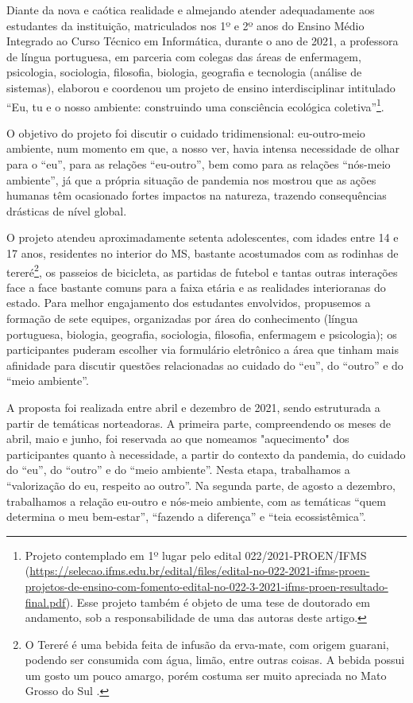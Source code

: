 Diante da nova e caótica realidade e almejando atender adequadamente aos estudantes da instituição, matriculados nos 1º e 2º anos do Ensino Médio Integrado ao Curso Técnico em Informática, durante o ano de 2021, a professora de língua portuguesa, em parceria com colegas das áreas de enfermagem, psicologia, sociologia, filosofia, biologia, geografia e tecnologia (análise de sistemas), elaborou e coordenou um projeto de ensino interdisciplinar intitulado “Eu, tu e o nosso ambiente: construindo uma consciência ecológica coletiva”\footnote{ Projeto contemplado em 1º lugar pelo edital 022/2021-PROEN/IFMS (\url{https://selecao.ifms.edu.br/edital/files/edital-no-022-2021-ifms-proen-projetos-de-ensino-com-fomento-edital-no-022-3-2021-ifms-proen-resultado-final.pdf}). Esse projeto também é objeto de uma tese de doutorado em andamento, sob a responsabilidade de uma das autoras deste artigo.}.

O objetivo do projeto foi discutir o cuidado tridimensional: eu-outro-meio ambiente, num momento em que, a nosso ver, havia intensa necessidade de olhar para o “eu”, para as relações “eu-outro”, bem como para as relações “nós-meio ambiente”, já que a própria situação de pandemia nos mostrou que as ações humanas têm ocasionado fortes impactos na natureza, trazendo consequências drásticas de nível global.

O projeto atendeu aproximadamente setenta adolescentes, com idades entre 14 e 17 anos, residentes no interior do MS, bastante acostumados com as rodinhas de tereré\footnote{ O Tereré é uma bebida feita de infusão da erva-mate, com origem guarani, podendo ser consumida com água, limão, entre outras coisas. A bebida possui um gosto um pouco amargo, porém costuma ser muito apreciada no Mato Grosso do Sul \cite{mato_grosso_do_sul_por_favor_historia_2020}.}, os passeios de bicicleta, as partidas de futebol e tantas outras interações face a face bastante comuns para a faixa etária e as realidades interioranas do estado. Para melhor engajamento dos estudantes envolvidos, propusemos a formação de sete equipes, organizadas por área do conhecimento (língua portuguesa, biologia, geografia, sociologia, filosofia, enfermagem e psicologia); os participantes puderam escolher via formulário eletrônico a área que tinham mais afinidade para discutir questões relacionadas ao cuidado do “eu”, do “outro” e do “meio ambiente”.

A proposta foi realizada entre abril e dezembro de 2021, sendo estruturada a partir de temáticas norteadoras. A primeira parte, compreendendo os meses de abril, maio e junho, foi reservada ao que nomeamos "aquecimento" dos participantes quanto à necessidade, a partir do contexto da pandemia, do cuidado do “eu”, do “outro” e do “meio ambiente”. Nesta etapa, trabalhamos a “valorização do eu, respeito ao outro”. Na segunda parte, de agosto a dezembro, trabalhamos a relação eu-outro e nós-meio ambiente, com as temáticas “quem determina o meu bem-estar”, “fazendo a diferença” e “teia ecossistêmica”.

